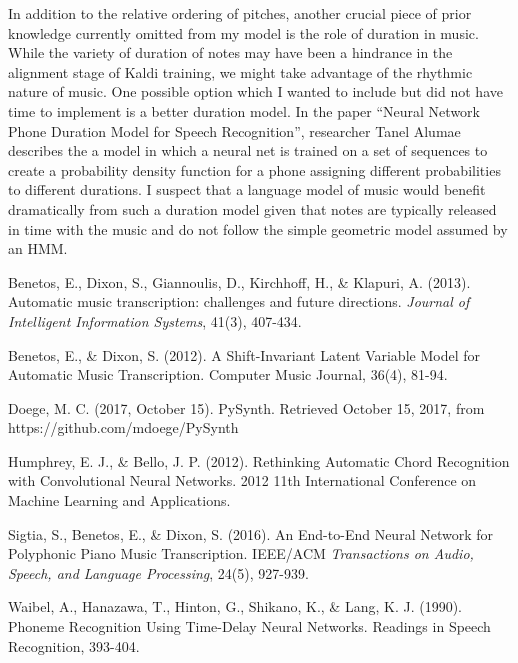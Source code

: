 \documentclass[conference]{IEEEtran}
\begin{document}
In addition to the relative ordering of pitches, another crucial piece of prior knowledge currently omitted from my model is the role of duration in music. While the variety of duration of notes may have been a hindrance in the alignment stage of Kaldi training, we might take advantage of the rhythmic nature of music. One possible option which I wanted to include but did not have time to implement is a better duration model. In the paper ``Neural Network Phone Duration Model for Speech Recognition'', researcher Tanel Alumae describes the a model in which a neural net is trained on a set of sequences to create a probability density function for a phone assigning different probabilities to different durations. I suspect that a language model of music would benefit dramatically from such a duration model given that notes are typically released in time with the music and do not follow the simple geometric model assumed by an HMM.

\begin{thebibliography}{99} %

Benetos, E., Dixon, S., Giannoulis, D., Kirchhoff, H., \& Klapuri, A. (2013). Automatic music transcription: challenges and future directions. \textit{Journal of Intelligent Information Systems}, 41(3), 407-434.

Benetos, E., \& Dixon, S. (2012). A Shift-Invariant Latent Variable Model for Automatic Music Transcription. Computer Music Journal, 36(4), 81-94.

Doege, M. C. (2017, October 15). PySynth. Retrieved October 15, 2017, from https://github.com/mdoege/PySynth

Humphrey, E. J., \& Bello, J. P. (2012). Rethinking Automatic Chord Recognition with Convolutional Neural Networks. 2012 11th International Conference on Machine Learning and Applications. 

Sigtia, S., Benetos, E., \& Dixon, S. (2016). An End-to-End Neural Network for Polyphonic Piano Music Transcription. IEEE/ACM \textit{Transactions on Audio, Speech, and Language Processing}, 24(5), 927-939.

Waibel, A., Hanazawa, T., Hinton, G., Shikano, K., \& Lang, K. J. (1990). Phoneme Recognition Using Time-Delay Neural Networks. Readings in Speech Recognition, 393-404.
 
\end{thebibliography}
\end{document}
